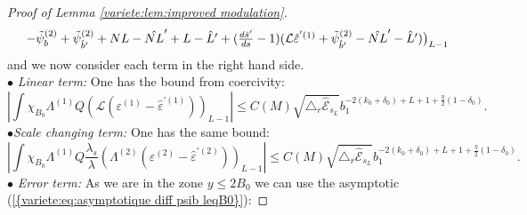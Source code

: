 \documentclass[11pt,a4paper,reqno]{amsart}
\theoremstyle{remark}
\numberwithin{equation}{section}
\begin{document}
\begin{proof}[Proof of Lemma \ref{variete:lem:improved modulation}]
\begin{equation}
\begin{array}{r c l}
&-\tilde{\psi}_b^{(2)}+\tilde{\psi}_{\hat{b}'}^{(2)}+NL-\hat{NL}'+L-\hat{L}'+(\frac{d\hat{s}'}{ds}-1)(\mathcal{L}\hat{\varepsilon}^{'(1)}+\tilde{\psi}_{\hat{b}'}^{(2)}-\hat{NL}'-\hat{L}' )  \bigr{)}_{L-1} 
\end{array}
\end{equation}
and we now consider each term in the right hand side. \\
$\bullet$ \emph{Linear term:} One has the bound from coercivity:
\begin{equation} \label{variete:eq:estimation premier terme improved intermediaire lineaire}
\left| \int \chi_{B_0}\Lambda^{(1)}Q (\mathcal{L}(\varepsilon^{(1)}-\hat{\varepsilon}^{'(1)}))_{L-1}  \right| \leq C(M) \sqrt{\triangle_r \hat{\mathcal{E}}_{s_L}} b_1^{-2(k_0+\delta_0)+L+1+\frac{\eta}{2}(1-\delta_0)} .
\end{equation}
$\bullet$\emph{Scale changing term:} One has the same bound:
\begin{equation}  \label{variete:eq:estimation premier terme improved intermediaire lambdavarepsilon}
\left| \int\chi_{B_0}\Lambda^{(1)}Q \frac{\lambda_s}{\lambda} (\Lambda^{(2)}(\varepsilon^{(2)}-\hat{\varepsilon}^{'(2)}))_{L-1} \right| \leq C(M) \sqrt{\triangle_r \hat{\mathcal{E}}_{s_L}} b_1^{-2(k_0+\delta_0)+L+1+\frac{\eta}{2}(1-\delta_0)} .
\end{equation}
$\bullet$ \emph{Error term:} As we are in the zone $y\leq 2B_0$ we can use the asymptotic {{\rm (\ref{{variete:eq:asymptotique diff psib leqB0}})}}:


\end{proof}
\end{document}

